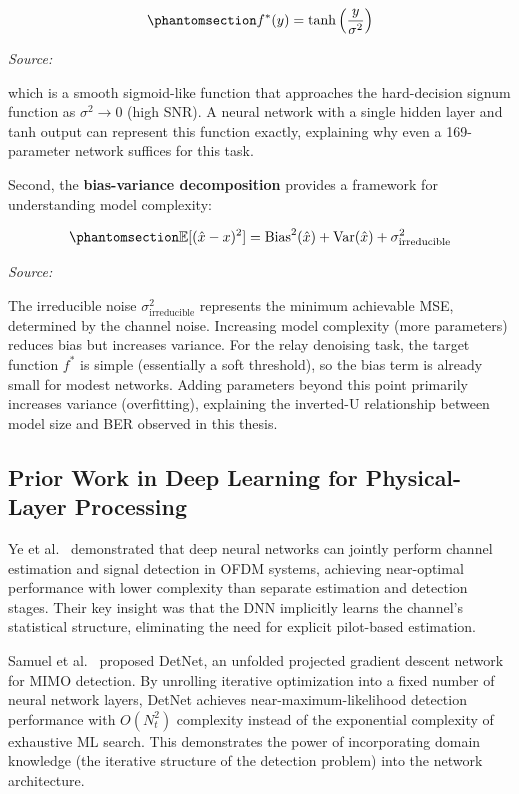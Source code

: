 \begin{equation}\protect\phantomsection\label{eq:optimal-denoiser-awgn}{f^*(y) = \tanh\left(\frac{y}{\sigma^2}\right)
}\end{equation} \par{\small\textit{Source: \cite{goodfellow2016deep}}}

which is a smooth sigmoid-like function that approaches the hard-decision signum function as \(\sigma^2 \to 0\) (high SNR). A neural network with a single hidden layer and tanh output can represent this function exactly, explaining why even a 169-parameter network suffices for this task.

Second, the \textbf{bias-variance decomposition} provides a framework for understanding model complexity:

\begin{equation}\protect\phantomsection\label{eq:bias-variance-decomp}{\mathbb{E}[(\hat{x} - x)^2] = \text{Bias}^2(\hat{x}) + \text{Var}(\hat{x}) + \sigma^2_{\text{irreducible}}
}\end{equation} \par{\small\textit{Source: \cite{goodfellow2016deep}}}

The irreducible noise \(\sigma^2_{\text{irreducible}}\) represents the minimum achievable MSE, determined by the channel noise. Increasing model complexity (more parameters) reduces bias but increases variance. For the relay denoising task, the target function \(f^*\) is simple (essentially a soft threshold), so the bias term is already small for modest networks. Adding parameters beyond this point primarily increases variance (overfitting), explaining the inverted-U relationship between model size and BER observed in this thesis.

\subsection{Prior Work in Deep Learning for Physical-Layer Processing}\label{sec:prior-work-in-deep-learning-for-physical-layer-processing}

Ye et al.~\cite{ye2018power} demonstrated that deep neural networks can jointly perform channel estimation and signal detection in OFDM systems, achieving near-optimal performance with lower complexity than separate estimation and detection stages. Their key insight was that the DNN implicitly learns the channel's statistical structure, eliminating the need for explicit pilot-based estimation.

Samuel et al.~\cite{samuel2019learning} proposed DetNet, an unfolded projected gradient descent network for MIMO detection. By unrolling iterative optimization into a fixed number of neural network layers, DetNet achieves near-maximum-likelihood detection performance with \(O(N_t^2)\) complexity instead of the exponential complexity of exhaustive ML search. This demonstrates the power of incorporating domain knowledge (the iterative structure of the detection problem) into the network architecture.

